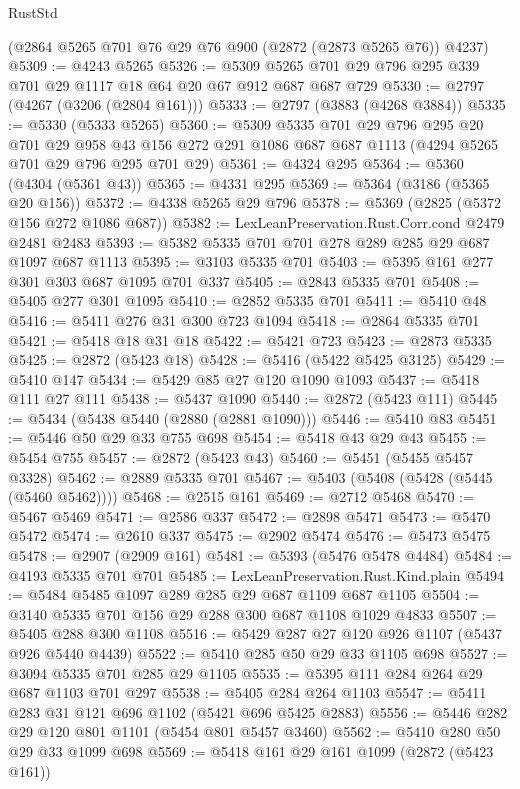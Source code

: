 \begin{lexlean}{RustStd}
\begin{coremodule}
{\begin{coremodule}
{{{{{{{{{{{{{{{{{{{{    (@2864 @5265 @701 @76 @29 @76 @900 (@2872 (@2873 @5265 @76)) @4237)
@5309 := @4243 @5265
@5326 := @5309 @5265 @701 @29 @796 @295 @339 @701 @29 @1117 @18 @64 @20 @67 @912 @687 @687 @729
@5330 := @2797 (@4267 (@3206 (@2804 @161)))
@5333 := @2797 (@3883 (@4268 @3884))
@5335 := @5330 (@5333 @5265)
@5360 := @5309
    @5335
    @701
    @29
    @796
    @295
    @20
    @701
    @29
    @958
    @43
    @156
    @272
    @291
    @1086
    @687
    @687
    @1113
    (@4294 @5265 @701 @29 @796 @295 @701 @29)
@5361 := @4324 @295
@5364 := @5360 (@4304 (@5361 @43))
@5365 := @4331 @295
@5369 := @5364 (@3186 (@5365 @20 @156))
@5372 := @4338 @5265 @29 @796
@5378 := @5369 (@2825 (@5372 @156 @272 @1086 @687))
@5382 := LexLeanPreservation.Rust.Corr.cond @2479 @2481 @2483
@5393 := @5382 @5335 @701 @701 @278 @289 @285 @29 @687 @1097 @687 @1113
@5395 := @3103 @5335 @701
@5403 := @5395 @161 @277 @301 @303 @687 @1095 @701 @337
@5405 := @2843 @5335 @701
@5408 := @5405 @277 @301 @1095
@5410 := @2852 @5335 @701
@5411 := @5410 @48
@5416 := @5411 @276 @31 @300 @723 @1094
@5418 := @2864 @5335 @701
@5421 := @5418 @18 @31 @18
@5422 := @5421 @723
@5423 := @2873 @5335
@5425 := @2872 (@5423 @18)
@5428 := @5416 (@5422 @5425 @3125)
@5429 := @5410 @147
@5434 := @5429 @85 @27 @120 @1090 @1093
@5437 := @5418 @111 @27 @111
@5438 := @5437 @1090
@5440 := @2872 (@5423 @111)
@5445 := @5434 (@5438 @5440 (@2880 (@2881 @1090)))
@5446 := @5410 @83
@5451 := @5446 @50 @29 @33 @755 @698
@5454 := @5418 @43 @29 @43
@5455 := @5454 @755
@5457 := @2872 (@5423 @43)
@5460 := @5451 (@5455 @5457 @3328)
@5462 := @2889 @5335 @701
@5467 := @5403 (@5408 (@5428 (@5445 (@5460 @5462))))
@5468 := @2515 @161
@5469 := @2712 @5468
@5470 := @5467 @5469
@5471 := @2586 @337
@5472 := @2898 @5471
@5473 := @5470 @5472
@5474 := @2610 @337
@5475 := @2902 @5474
@5476 := @5473 @5475
@5478 := @2907 (@2909 @161)
@5481 := @5393 (@5476 @5478 @4484)
@5484 := @4193 @5335 @701 @701
@5485 := LexLeanPreservation.Rust.Kind.plain
@5494 := @5484 @5485 @1097 @289 @285 @29 @687 @1109 @687 @1105
@5504 := @3140 @5335 @701 @156 @29 @288 @300 @687 @1108 @1029 @4833
@5507 := @5405 @288 @300 @1108
@5516 := @5429 @287 @27 @120 @926 @1107 (@5437 @926 @5440 @4439)
@5522 := @5410 @285 @50 @29 @33 @1105 @698
@5527 := @3094 @5335 @701 @285 @29 @1105
@5535 := @5395 @111 @284 @264 @29 @687 @1103 @701 @297
@5538 := @5405 @284 @264 @1103
@5547 := @5411 @283 @31 @121 @696 @1102 (@5421 @696 @5425 @2883)
@5556 := @5446 @282 @29 @120 @801 @1101 (@5454 @801 @5457 @3460)
@5562 := @5410 @280 @50 @29 @33 @1099 @698
@5569 := @5418 @161 @29 @161 @1099 (@2872 (@5423 @161))
}}}}}}}}}}}}}}}}}}}}
\end{coremodule}}
\end{coremodule}
\end{lexlean}
